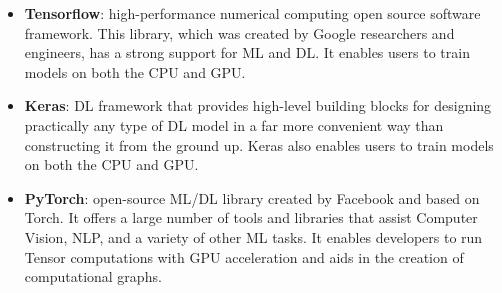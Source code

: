 \begin{itemize}
    \item \textbf{Tensorflow}: high-performance numerical computing open source software framework. This library, which was created by Google researchers and engineers, has a strong support for \gls{ML} and \gls{DL}.  It enables users to train models on both the CPU and GPU.
    \item \textbf{Keras}: \gls{DL} framework that provides high-level building blocks for designing practically any type of \gls{DL} model in a far more convenient way than constructing it from the ground up. Keras also enables users to train models on both the CPU and GPU.
    \item \textbf{PyTorch}: open-source \gls{ML}/\gls{DL} library created by Facebook and based on Torch. It offers a large number of tools and libraries that assist Computer Vision, \gls{NLP}, and a variety of other \gls{ML} tasks. It enables developers to run Tensor computations with GPU acceleration and aids in the creation of computational graphs.
\end{itemize}